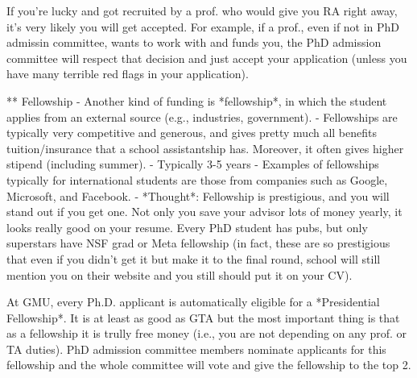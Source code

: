 \documentclass[10pt]{article}
\begin{document}
\begin{tcolorbox}[left=1pt,right=1pt,top=1pt,bottom=1pt]
If you're lucky and got recruited by a prof. who would give you RA right away, it's very likely you will get accepted.  For example, if a prof., even if not in PhD admissin committee, wants to work with and funds you, the PhD admission committee will respect that decision and just accept your application (unless you have many terrible red flags in your application).
\end{tcolorbox}

** Fellowship
- Another kind of funding is *fellowship*, in which the student applies from an external source (e.g., industries, government). 
- Fellowships are typically very competitive and generous, and gives pretty much all benefits tuition/insurance that a school assistantship has.  Moreover, it often gives higher stipend (including summer).
  - Typically 3-5 years
  - Examples of fellowships typically for international students are those from companies such as Google, Microsoft, and Facebook.
- *Thought*: Fellowship is prestigious, and you will stand out if you get one.  Not only you save your advisor lots of money yearly, it looks really good on your resume.  Every PhD student has pubs, but only superstars have NSF grad or Meta fellowship (in fact, these are so prestigious that even if you didn't get it but make it to the final round, school will still mention you on their website and you still should put it on your CV).


\begin{tcolorbox}[left=1pt,right=1pt,top=1pt,bottom=1pt]
At GMU, every Ph.D. applicant is automatically eligible for a *Presidential Fellowship*.  It is at least as good as GTA but the most important thing is that as a fellowship it is trully free money (i.e., you are not depending on any prof. or TA duties).  PhD admission committee members nominate applicants for this fellowship and the whole committee will vote and give the fellowship to the top 2.
\end{tcolorbox}





\newpage
\end{document}
